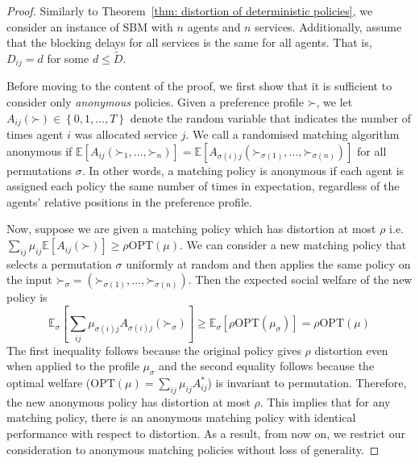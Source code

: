 \documentclass[letterpaper,11pt]{article}
\newcommand{\E}{\mathbb{E}}
\newcommand{\set}[1]{\left\{ #1 \right\}}
\newcommand{\opt}{\mathrm{OPT}}
\begin{document}
\begin{proof}
    Similarly to Theorem~\ref{thm: distortion of deterministic policies}, 
    we consider an instance of SBM with $n$ agents and $n$ services. Additionally, assume that the blocking delays for all services is the same for all agents. That is, $D_{ij} = d$ for some $d \leq \tilde{D}$. 
    
    Before moving to the content of the proof, we first show that it is sufficient to consider only \emph{anonymous} policies. Given a preference profile $\mathord{\succ}$, we let $A_{ij}(\mathord{\succ}) \in \set{0,1,\ldots,T}$ denote the random variable that indicates the number of times agent $i$ was allocated service $j$. We call a randomised matching algorithm anonymous if $\E[A_{ij}(\mathord{\succ}_1,\ldots,\mathord{\succ}_n)] = \E[A_{\sigma(i)j}(\mathord{\succ}_{\sigma(1)},\ldots, \mathord{\succ}_{\sigma(n)})]$ for all permutations $\sigma$. In other words, a matching policy is anonymous if each agent is assigned each policy the same number of times in expectation, regardless of the agents' relative positions in the preference profile.
    
    Now, suppose we are given a matching policy which has distortion at most $\rho$ i.e. $\sum_{ij} \mu_{ij} \E[A_{ij}(\mathord{\succ})] \ge \rho \opt(\mu)$. We can consider a new matching policy that selects a  permutation $\sigma$ uniformly at random and then applies the same policy on the input $\mathord{\succ}_\sigma = (\mathord{\succ}_{\sigma(1)}, \ldots, \mathord{\succ}_{\sigma(n)})$. Then the expected social welfare of the new policy is 
    $$
    \E_{\sigma}\left[\sum_{ij} \mu_{\sigma(i)j} A_{\sigma(i)j}(\mathord{\succ}_\sigma) \right] \ge \E_{\sigma}\left[ \rho \opt(\mu_\sigma)\right] = \rho \opt(\mu)
    $$
    The first inequality follows because the original policy gives $\rho$ distortion even when applied to the profile $\mu_\sigma$ and the second equality follows because the optimal welfare ($\opt(\mu) = \sum_{ij} \mu_{ij} A^*_{ij}$) is invariant to permutation. Therefore, the new anonymous policy has distortion at most $\rho$. This implies that for any matching policy, there is an anonymous matching policy with identical performance with respect to distortion. As a result, from now on, we restrict our consideration to anonymous matching policies without loss of generality.
    

\end{proof}
\end{document}
